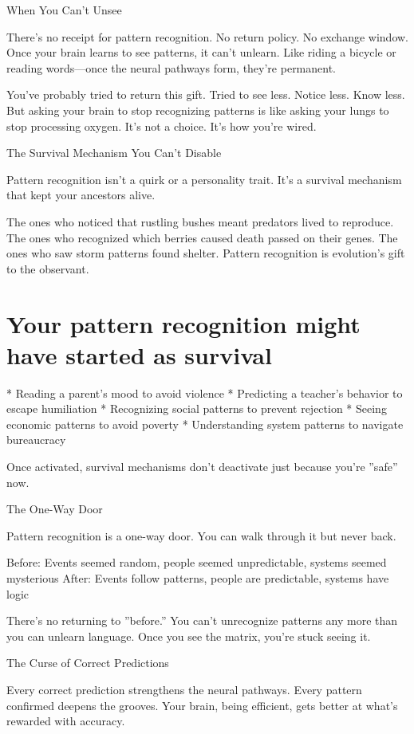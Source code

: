 \documentclass[12pt,oneside]{book}
\begin{document}
When You Can't Unsee

There's no receipt for pattern recognition. No return policy. No exchange window. Once your brain learns to see patterns, it can't unlearn. Like riding a bicycle or reading words---once the neural pathways form, they're permanent.

You've probably tried to return this gift. Tried to see less. Notice less. Know less. But asking your brain to stop recognizing patterns is like asking your lungs to stop processing oxygen. It's not a choice. It's how you're wired.

The Survival Mechanism You Can't Disable

Pattern recognition isn't a quirk or a personality trait. It's a survival mechanism that kept your ancestors alive.

The ones who noticed that rustling bushes meant predators lived to reproduce. The ones who recognized which berries caused death passed on their genes. The ones who saw storm patterns found shelter. Pattern recognition is evolution's gift to the observant.

\section{Your pattern recognition might have started as survival}

                    * Reading a parent's mood to avoid violence
                    * Predicting a teacher's behavior to escape humiliation
                    * Recognizing social patterns to prevent rejection
                    * Seeing economic patterns to avoid poverty
                    * Understanding system patterns to navigate bureaucracy

Once activated, survival mechanisms don't deactivate just because you're ''safe'' now.

The One-Way Door

Pattern recognition is a one-way door. You can walk through it but never back.

Before: Events seemed random, people seemed unpredictable, systems seemed mysterious After: Events follow patterns, people are predictable, systems have logic

There's no returning to ''before.'' You can't unrecognize patterns any more than you can unlearn language. Once you see the matrix, you're stuck seeing it.

The Curse of Correct Predictions

Every correct prediction strengthens the neural pathways. Every pattern confirmed deepens the grooves. Your brain, being efficient, gets better at what's rewarded with accuracy.
\end{document}
